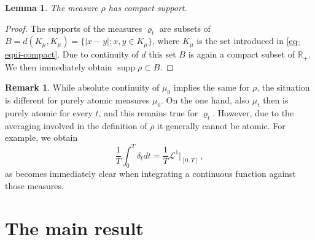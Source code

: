 \documentclass[A4paper,11pt]{article}
\newtheorem{lemma}[theorem]{Lemma}
\theoremstyle{definition}
\newtheorem{remark}{Remark}
\newcommand{\R}{\mathbb{R}}
\newcommand{\cl}{\mathcal{L}}
\DeclareMathOperator{\supp}{supp}
\begin{document}
\begin{lemma}
	The measure $\rho$ has compact support.
\end{lemma}

\begin{proof}
	The supports of the measures $\varrho_t$ are subsets of $B=d(K_\mu,K_\mu)=\{|x-y|:x,y\in K_\mu\}$, where
	$K_\mu$ is the set introduced in \eqref{eq-equi-compact}.
	Due to continuity of $d$ this set $B$ is again a compact subset of $\R_+$. We then immediately obtain
	$\supp\rho\subset B$.
\end{proof}

\begin{remark}
	While absolute continuity of $\mu_0$ implies the same for $\rho$, the situation is different for purely atomic
	measures $\mu_0$. On the one hand, also $\mu_t$ then is purely atomic for every $t$, and this remains true for
	$\varrho_t$. However, due to the averaging involved in the definition of $\rho$ it generally cannot be atomic. For
	example, we obtain
	\[
		\frac{1}{T}\int_0^T\delta_t dt=\frac{1}{T}\cl^1|_{[0,T]}\,,
	\]
	as becomes immediately clear when integrating a continuous function against those measures.
\end{remark}


\section{The main result}
\end{document}

